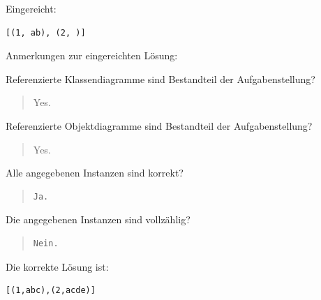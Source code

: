Eingereicht:


\begin{verbatim}
[(1, ab), (2, )]
\end{verbatim}


Anmerkungen zur eingereichten Lösung:

Referenzierte Klassendiagramme sind Bestandteil der Aufgabenstellung?\begin{quote}Yes.\end{quote}Referenzierte Objektdiagramme sind Bestandteil der Aufgabenstellung?\begin{quote}Yes.\end{quote}Alle angegebenen Instanzen sind korrekt?

\begin{quote}
\begin{verbatim}
Ja.
\end{verbatim}
\end{quote}

Die angegebenen Instanzen sind vollzählig?

\begin{quote}
\begin{verbatim}
Nein.
\end{verbatim}
\end{quote}

Die korrekte Lösung ist:
\begin{verbatim}
[(1,abc),(2,acde)]
\end{verbatim}



